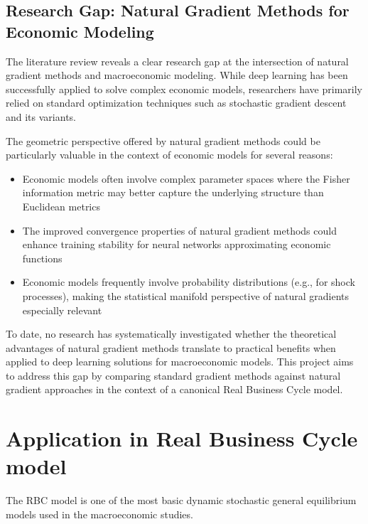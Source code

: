 \documentclass[a4paper]{article}
\begin{document}
\subsection{Research Gap: Natural Gradient Methods for Economic Modeling}

The literature review reveals a clear research gap at the intersection of natural gradient methods and macroeconomic modeling. While deep learning has been successfully applied to solve complex economic models, researchers have primarily relied on standard optimization techniques such as stochastic gradient descent and its variants.

The geometric perspective offered by natural gradient methods could be particularly valuable in the context of economic models for several reasons:

\begin{itemize}
    \item Economic models often involve complex parameter spaces where the Fisher information metric may better capture the underlying structure than Euclidean metrics
    \item The improved convergence properties of natural gradient methods could enhance training stability for neural networks approximating economic functions
    \item Economic models frequently involve probability distributions (e.g., for shock processes), making the statistical manifold perspective of natural gradients especially relevant
\end{itemize}

To date, no research has systematically investigated whether the theoretical advantages of natural gradient methods translate to practical benefits when applied to deep learning solutions for macroeconomic models. This project aims to address this gap by comparing standard gradient methods against natural gradient approaches in the context of a canonical Real Business Cycle model.


\section{Application in Real Business Cycle model}
The RBC model is one of the most basic dynamic stochastic general equilibrium models used in the macroeconomic studies. 
\printbibliography{}
\newpage
\end{document}
